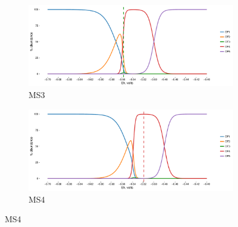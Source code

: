\begin{figure}[h]\ContinuedFloat
\centering

    \begin{subfigure}[b]{\linewidth}
       	\includegraphics[width=1\linewidth]{"figs_app2/Mound OF3_thermo"}
       	\caption{MS3}
        \label{fig:MS3_thermo}
    \end{subfigure}
    \begin{subfigure}[b]{\linewidth}
    	\includegraphics[width=1\linewidth]{"figs_app2/Mound OF4_thermo"}
    	\caption{MS4}
        \label{fig:MS4_thermo}
    \end{subfigure}
    
\end{figure}

\newpage


